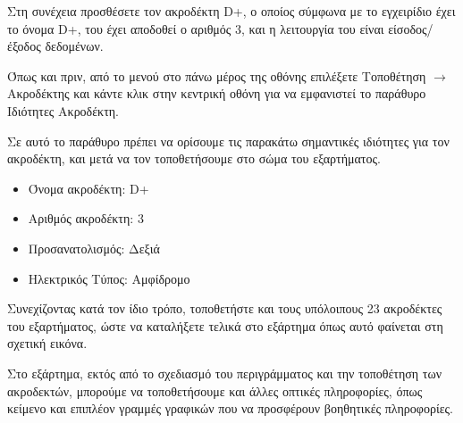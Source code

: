 \documentclass[a4paper]{article}
\begin{document}
\begin{figure}
  \begin{center}
    \label{fig:kicad-main}
  \end{center}
\end{figure}

Στη συνέχεια προσθέσετε τον ακροδέκτη D+, ο οποίος σύμφωνα με το εγχειρίδιο έχει το όνομα D+, του έχει αποδοθεί ο αριθμός 3, και η λειτουργία του είναι είσοδος/έξοδος δεδομένων.

Όπως και πριν, από το μενού στο πάνω μέρος της οθόνης επιλέξετε Τοποθέτηση $\rightarrow$ Ακροδέκτης και κάντε κλικ στην κεντρική οθόνη για να εμφανιστεί το παράθυρο Ιδιότητες Ακροδέκτη.

Σε αυτό το παράθυρο πρέπει να ορίσουμε τις παρακάτω σημαντικές ιδιότητες για τον ακροδέκτη, και μετά να τον τοποθετήσουμε στο σώμα του εξαρτήματος.

\begin{itemize}
    \item Όνομα ακροδέκτη: D+
    \item Αριθμός ακροδέκτη: 3
    \item Προσανατολισμός: Δεξιά
    \item Ηλεκτρικός Τύπος: Αμφίδρομο
\end{itemize}

\begin{figure}
  \begin{center}
    \label{fig:kicad-main}
  \end{center}
\end{figure}

Συνεχίζοντας κατά τον ίδιο τρόπο, τοποθετήστε και τους υπόλοιπους 23 ακροδέκτες του εξαρτήματος, ώστε να καταλήξετε τελικά στο εξάρτημα όπως αυτό φαίνεται στη σχετική εικόνα.

\begin{figure}
  \begin{center}
    \label{fig:kicad-main}
  \end{center}
\end{figure}

Στο εξάρτημα, εκτός από το σχεδιασμό του περιγράμματος και την τοποθέτηση των ακροδεκτών, μπορούμε να τοποθετήσουμε και άλλες οπτικές πληροφορίες, όπως κείμενο και επιπλέον γραμμές γραφικών που να προσφέρουν βοηθητικές πληροφορίες.
\end{document}
